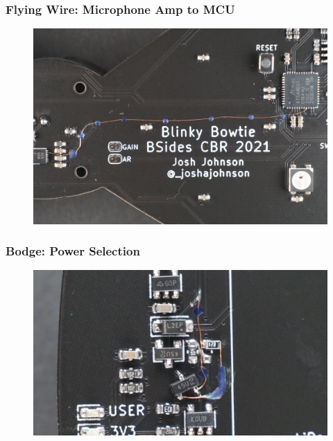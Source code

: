\documentclass[aspectratio=169, t]{beamer}
\begin{document}
\begin{frame}
\frametitle{Flying Wire: Microphone Amp to MCU}
	\begin{figure}
		\includegraphics[width=0.7\linewidth]{images/bowtie-long-wire.jpeg}
	\end{figure}
\end{frame}

\begin{frame}
\frametitle{Bodge: Power Selection}
	\begin{figure}
		\includegraphics[width=0.8\linewidth]{images/bowtie-power.JPG}
	\end{figure}
\end{frame}
\end{document}
